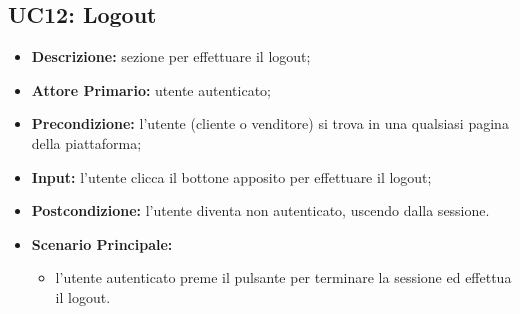 \subsection{UC12: Logout}
\begin{itemize}
    \item \textbf{Descrizione:} sezione per effettuare il logout;
    \item \textbf{Attore Primario:} utente autenticato;
    \item \textbf{Precondizione:} l'utente (cliente o venditore) si trova in una qualsiasi pagina della piattaforma;
    \item \textbf{Input:} l'utente clicca il bottone apposito per effettuare il logout;
    \item \textbf{Postcondizione:} l'utente diventa non autenticato, uscendo dalla sessione.
    \item \textbf{Scenario Principale:}
    \begin{itemize}
        \item l'utente autenticato preme il pulsante per terminare la sessione ed effettua il logout.
    \end{itemize}
\end{itemize}